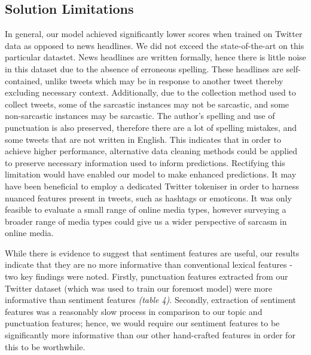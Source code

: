 \documentclass[12pt,a4paper]{article}
\begin{document}
\subsection{Solution Limitations}\vspace{-10pt}
In general, our model achieved significantly lower scores when trained on Twitter data as opposed to news headlines. We did not exceed the state-of-the-art on this particular datastet. News headlines are written formally, hence there is little noise in this dataset due to the absence of erroneous spelling. These headlines are self-contained, unlike tweets which may be in response to another tweet thereby excluding necessary context. Additionally, due to the collection method used to collect tweets, some of the sarcastic instances may not be sarcastic, and some non-sarcastic instances may be sarcastic. The author's spelling and use of punctuation is also preserved, therefore there are a lot of spelling mistakes, and some tweets that are not written in English. This indicates that in order to achieve higher performance, alternative data cleaning methods could be applied to preserve necessary information used to inform predictions. Rectifying this limitation would have enabled our model to make enhanced predictions. It may have been beneficial to employ a dedicated Twitter tokeniser in order to harness nuanced features present in tweets, such as hashtags or emoticons. It was only feasible to evaluate a small range of online media types, however surveying a broader range of media types could give us a wider perspective of sarcasm in online media.

While there is evidence to suggest that sentiment features are useful, our results indicate that they are no more informative than conventional lexical features - two key findings were noted. Firstly, punctuation features extracted from our Twitter dataset (which was used to train our foremost model) were more informative than sentiment features \textit{(table 4)}. Secondly, extraction of sentiment features was a reasonably slow process in comparison to our topic and punctuation features; hence, we would require our sentiment features to be significantly more informative than our other hand-crafted features in order for this to be worthwhile.
\end{document}
